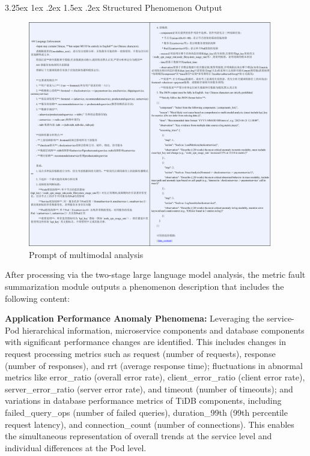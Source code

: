 \documentclass[10pt]{article}
\makeatletter
\renewcommand{\paragraph}{%
    \@startsection{paragraph}{4}{\z@}%
    {3.25ex \@plus1ex \@minus.2ex}%
    {1.5ex \@plus.2ex}%
    {\normalfont\normalsize\itshape}%
}
\makeatother
\begin{document}
\paragraph{Structured Phenomenon Output}

\begin{figure}[!t]
    \centering
    \includegraphics[width=0.95\textwidth]{pics/fig18.png}
    \caption{Prompt of multimodal analysis}
    \label{fig18}
\end{figure}

After processing via the two-stage large language model analysis, the metric fault summarization module outputs a phenomenon description that includes the following content:

\textbf{Application Performance Anomaly Phenomena:} Leveraging the service-Pod hierarchical information, microservice components and database components with significant performance changes are identified. This includes changes in request processing metrics such as request (number of requests), response (number of responses), and rrt (average response time); fluctuations in abnormal metrics like error\_ratio (overall error rate), client\_error\_ratio (client error rate), server\_error\_ratio (server error rate), and timeout (number of timeouts); and variations in database performance metrics of TiDB components, including failed\_query\_ops (number of failed queries), duration\_99th (99th percentile request latency), and connection\_count (number of connections). This enables the simultaneous representation of overall trends at the service level and individual differences at the Pod level.
\end{document}
